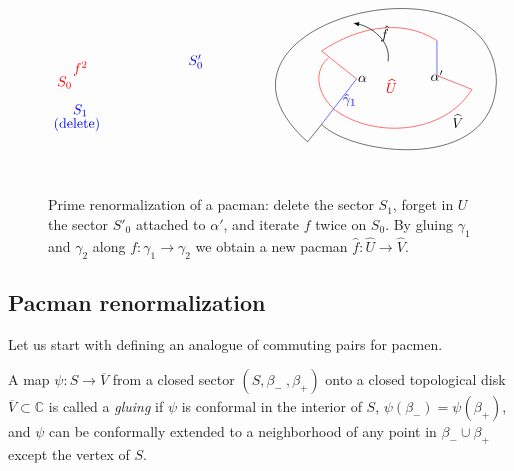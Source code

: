 \documentclass[]{amsart}
\newcommand{\C}{\mathbb{C}}
\theoremstyle{remark}
\numberwithin{equation}{section}
\theoremstyle{definition}
\begin{document}
\begin{figure}[t!]
{\[\begin{tikzpicture}[ scale=0.88]
\node[red] at (-4.7,1.8) {$f^2$};
\node[blue] at (-4.8,0.2) {(delete)};
\node[blue] at (-4.7,0.6) {$S_{1}$};
\node[blue] at (-1.4,2) {$S'_{0}$};
\node[red] at (-5.15,1.4) {$S_{0}$};



  \begin{scope}[shift={(-0.4,0)}, scale =1]
\coordinate (w8) at (5.9,1.6) {} {} {};
\coordinate (w9) at (3.6,1.5) {} {};
\draw[red] (2.6,2.3) -- (w9);
\draw (w9);
\draw[blue] (w9) -- (2.6,0.2);
\draw (2.2,-0.3) -- (2.6,0.2);
\draw (2.2,-0.3) .. controls (-1.6,3.1) and (7.6,5.4) .. (7.6,1.4);
\draw (2.6,0.2) .. controls (3.5,-0.7) and (7.5,-1.2) .. (7.6,1.4);
\draw[blue] (w8) -- (5.9,2.6);
\draw[red] (w8) -- (6.9,1.2);
\draw[red] (5.9,2.6) .. controls (4.8,3.3) and (3.5,2.9) .. (2.6,2.3);
\draw[red] (2.8,2.1) .. controls (2.4,1.8) and (2.4,1.1) .. (3,0.6);
\draw[red] (3,0.6) .. controls (4.1,-0.2) and (6.1,-0.1) .. (6.9,1.2);
\node[shift={(0.15,0)}]  at (3.6,1.5) {$\alpha$};
\node at (5.9,1.6) {$\alpha'$};
\node[red] at (4.6,1.3) {$\widehat U$};
\draw[line  width=0.5pt,-latex] (4.5,2) .. controls (4.6,2.6) and (4,3) .. (3.5,3.1);
\node at (4.4,2.8) {$\hat f$};
\node at (6.5,0.3) {$\widehat V$};
\node[blue] at (3.4,0.9) {$\hat \gamma_1$};

\end{scope}
\end{tikzpicture}\]}


\caption{Prime renormalization of a pacman: delete the sector $S_{1}$, forget in $U$ the sector $S'_{0}$ attached to $\alpha'$, and iterate $f$ twice on $S_{0}$. By gluing $\gamma_1$ and $\gamma_2$ along $f:\gamma_1\to \gamma_2$ we obtain a new pacman $\hat f:\widehat U\to \widehat V.$
 }
\label{Fg:PacmanRenorm}
\end{figure}







\subsection{Pacman renormalization}
\label{sec:PacmenRenorm} 
 Let us start with defining an analogue of commuting pairs for pacmen.

A map $\psi \colon S \to \overline{V}$ from a closed sector $(S,\beta_-~,\beta_+)$ onto a closed topological disk $\overline{V}\subset \C$ is called a \emph{gluing} if $\psi$ is conformal in the interior of $S$, $\psi(\beta_-)=\psi(\beta_+)$, and  $\psi$ can be conformally extended to a neighborhood of any point in $\beta_-\cup \beta_+$ except the vertex of $S$.
\end{document}

